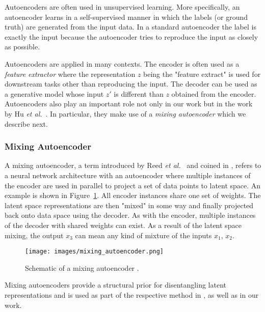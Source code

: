 \documentclass[12pt,a4paper]{article}
\begin{document}
Autoencoders are often used in unsupervised learning. More specifically, an autoencoder learns in a self-supervised manner in which the labels (or ground truth) are generated from the input data. In a standard autoencoder the label is exactly the input because the autoencoder tries to reproduce the input as closely as possible. 

Autoencoders are applied in many contexts. The encoder is often used as a \textit{feature extractor} where the representation $z$ being the "feature extract" is used for downstream tasks other than reproducing the input. The decoder can be used as a generative model whose input $z'$ is different than $z$ obtained from the encoder. Autoencoders also play an important role not only in our work but in the work by Hu \textit{et al.}~\cite{DisentFacOfVarByMixTh}. In particular, they make use of a \textit{mixing autoencoder} which we describe next.


\subsubsection{Mixing Autoencoder}\label{subsec:mixAE}
A mixing autoencoder, a term introduced by Reed \textit{et al.}~\cite{DeepVisAnaMak} and coined in \cite{DisentFacOfVarByMixTh}, refers to a neural network architecture with an autoencoder where multiple instances of the encoder are used in parallel to project a set of data points to latent space. An example is shown in Figure~\ref{fig:mixing_autoencoder}. All encoder instances share one set of weights. The latent space representations are then "mixed" in some way and finally projected back onto data space using the decoder. As with the encoder, multiple instances of the decoder with shared weights can exist. As a result of the latent space mixing, the output $x_3$ can mean any kind of mixture of the inputs $x_1$, $x_2$.
\begin{figure}[ht]
\centering
\texttt{[image: images/mixing\_autoencoder.png]}
\caption{Schematic of a mixing autoencoder \cite{DisentFacOfVarByMixTh}.}
\label{fig:mixing_autoencoder}
\end{figure}

Mixing autoencoders provide a structural prior for disentangling latent representations and is used as part of the respective method in \cite{DeepVisAnaMak}, \cite{DisentFacOfVarByMixTh} as well as in our work.


\end{document}
